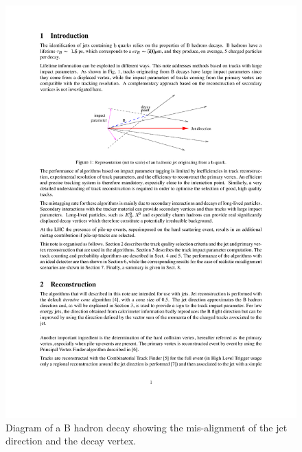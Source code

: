 \begin{figure}
\begin{center}
\includegraphics[width=.7\textwidth]{figures/an_jetid/DIAGRAMS/b_diagram}
\end{center}
\caption{Diagram of a B hadron decay showing the mis-alignment of the jet direction and the decay vertex.}
\label{fig:bdiagram}
\end{figure}

